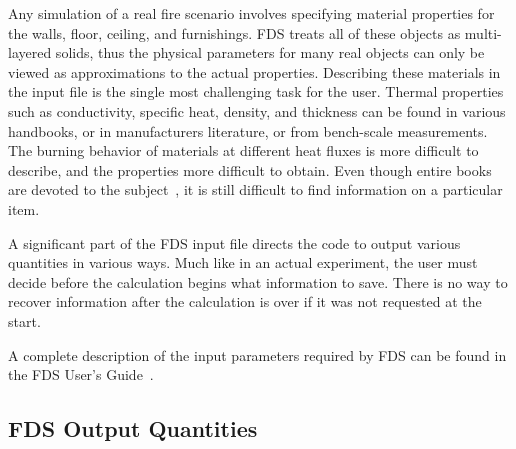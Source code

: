 \documentclass[11pt]{book}
\begin{document}
Any simulation of a real fire scenario involves specifying material properties for the walls, floor, ceiling,
and furnishings. FDS treats all of these objects as multi-layered solids, thus the physical parameters for many real
objects can only be viewed as approximations to the actual properties. Describing these materials in the input file is
the single most challenging task for the user. Thermal properties such as conductivity, specific heat,
density, and thickness can be found in various handbooks, or in manufacturers literature, or from bench-scale measurements.
The burning behavior of materials at different heat fluxes is more difficult to describe, and the properties more difficult
to obtain. Even though entire books are devoted to the
subject~\cite{Babrauskas:2}, it is still difficult to find information on a particular item.

A significant part of the FDS input file directs the code to output various quantities in various ways. Much like in an
actual experiment, the user must decide before the calculation begins what information to save. There is no way to
recover information after the calculation is over if it was not requested at the start.

A complete description of the input parameters required by FDS can be found in the FDS User's Guide~\cite{FDS_Users_Guide_5}.




\subsection{FDS Output Quantities}
\end{document}
